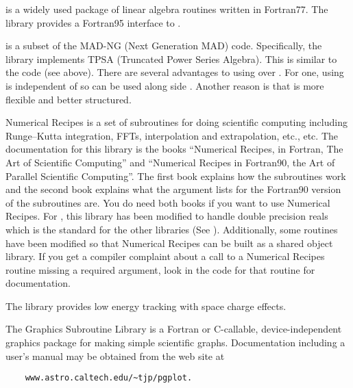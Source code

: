 {{{{{{\begin{description}
  \item[lapack / lapack95] \Newline
{} is a widely used package of linear algebra routines written in Fortran77. The
 library provides a Fortran95 interface to .
%
  \item[mad_tpsa] \Newline
{} is a subset of the MAD-NG (Next Generation MAD) code\cite{b:mad.ng}. Specifically, the
 library implements TPSA (Truncated Power Series Algebra). This is similar to the
 code (see above). There are several advantages to using  over . For one, using
 is independent of  so  can be used along side . Another
reason is that  is more flexible and better structured.
%
  \item[recipes] \Newline
Numerical Recipes is a set of subroutines for doing scientific computing including Runge--Kutta
integration, FFTs, interpolation and extrapolation, etc., etc. The documentation for this library is
the books ``Numerical Recipes, in Fortran, The Art of Scientific Computing'' and ``Numerical Recipes
in Fortran90, the Art of Parallel Scientific Computing''\cite{b:nr}.  The first book explains how
the subroutines work and the second book explains what the argument lists for the Fortran90 version
of the subroutines are. You do need both books if you want to use Numerical Recipes. For \bmad, this
library has been modified to handle double precision reals which is the standard for the other
libraries (See ). Additionally, some routines have been modified so that Numerical
Recipes can be built as a shared object library. If you get a compiler complaint about a call to a
Numerical Recipes routine missing a required argument, look in the code for that routine for
documentation.
%
  \item[open_spacecharge] \Newline
The  library provides low energy tracking with space charge effects.
%
  \item[PGPLOT] \Newline
The  Graphics Subroutine Library is a Fortran or C-callable, device-independent graphics
package for making simple scientific graphs. Documentation including a user's manual may be obtained
from the  web site at
\begin{verbatim}
    www.astro.caltech.edu/~tjp/pgplot.
\end{verbatim} 

\end{description}}}}}}}
